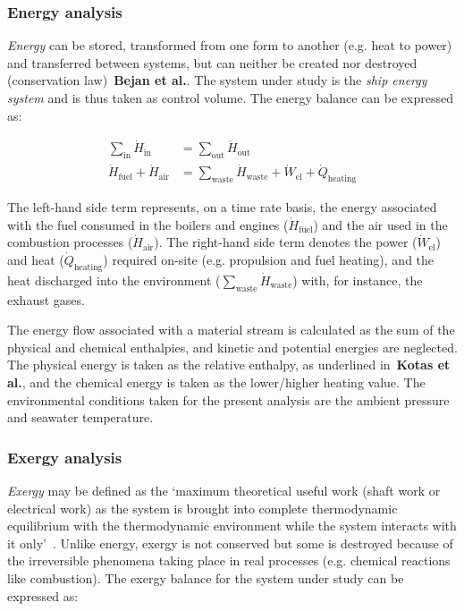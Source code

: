 \documentclass[preprint,12pt]{elsarticle}
\begin{document}
\subsubsection{Energy analysis}

\emph{Energy} can be stored, transformed from one form to another (e.g. heat to power) and transferred between systems, but can neither be created nor destroyed (conservation law)~\textbf{Bejan et al.}. The system under study is the \emph{ship energy system} and is thus taken as control volume. The energy balance can be expressed as:

\begin{align}
	\sum_{\mathrm{in}} \dot{H}_{\mathrm{in}} &= \sum_{\mathrm{out}} \dot{H}_{\mathrm{out}} \\
	\dot{H}_{\mathrm{fuel}} + \dot{H}_{\mathrm{air}} &= \sum_{{\mathrm{waste}}}\dot{H}_{{\mathrm{waste}}}+\dot{W}_{\mathrm{el}}+\dot{Q}_{\mathrm{heating}}
\end{align}

The left-hand side term represents, on a time rate basis, the energy associated with the fuel consumed in the boilers and engines ($\dot{H}_{\mathrm{fuel}}$) and the air used in the combustion processes ($\dot{H}_{\mathrm{air}}$). The right-hand side term denotes the power ($\dot{W}_{\mathrm{el}}$) and heat ($\dot{Q}_{\mathrm{heating}}$) required on-site (e.g. propulsion and fuel heating), and the heat discharged into the environment ($\sum_{{\mathrm{waste}}}\dot{H}_{{\mathrm{waste}}}$) with, for instance, the exhaust gases.

The energy flow associated with a material stream is calculated as the sum of the physical and chemical enthalpies, and kinetic and potential energies are neglected.    The physical energy is taken as the relative enthalpy, as underlined in~\textbf{Kotas et al.}, and the chemical energy is taken as the lower/higher heating value. The environmental conditions taken for the present analysis are the ambient pressure and seawater temperature.

\subsubsection{Exergy analysis}

\emph{Exergy} may be defined as the `maximum theoretical useful work (shaft work or electrical work) as the system is brought into complete thermodynamic equilibrium with the thermodynamic environment while the system interacts with it only'~\citep{Moran1989}. Unlike energy, exergy is not conserved but some is destroyed because of the irreversible phenomena taking place in real processes (e.g. chemical reactions like combustion). The exergy balance for the system under study can be expressed as:
\end{document}
